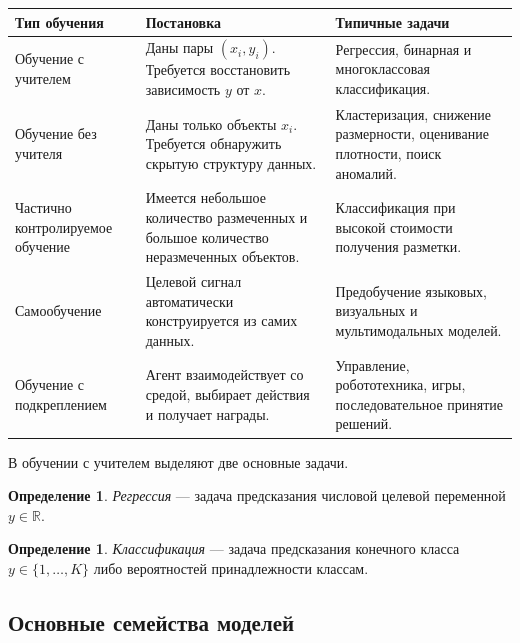 \documentclass[12pt,a4paper]{article}
\theoremstyle{definition}
\newtheorem{definition}[theorem]{Определение}
\theoremstyle{remark}
\newcommand{\R}{\mathbb{R}}
\begin{document}
\begin{table}[ht]
\centering
\begin{tabularx}{\textwidth}{
    >{\raggedright\arraybackslash}p{3.2cm}
    >{\raggedright\arraybackslash}X
    >{\raggedright\arraybackslash}p{4.4cm}}
\toprule
\textbf{Тип обучения} & \textbf{Постановка} & \textbf{Типичные задачи}\\
\midrule
Обучение с учителем &
Даны пары $(x_i,y_i)$. Требуется восстановить зависимость $y$ от $x$. &
Регрессия, бинарная и многоклассовая классификация.\\

Обучение без учителя &
Даны только объекты $x_i$. Требуется обнаружить скрытую структуру данных. &
Кластеризация, снижение размерности, оценивание плотности, поиск аномалий.\\

Частично контролируемое обучение &
Имеется небольшое количество размеченных и большое количество
неразмеченных объектов. &
Классификация при высокой стоимости получения разметки.\\

Самообучение &
Целевой сигнал автоматически конструируется из самих данных. &
Предобучение языковых, визуальных и мультимодальных моделей.\\

Обучение с подкреплением &
Агент взаимодействует со средой, выбирает действия и получает награды. &
Управление, робототехника, игры, последовательное принятие решений.\\
\bottomrule
\end{tabularx}
\end{table}

В обучении с учителем выделяют две основные задачи.

\begin{definition}
\emph{Регрессия} --- задача предсказания числовой целевой переменной
$y\in\R$.
\end{definition}

\begin{definition}
\emph{Классификация} --- задача предсказания конечного класса
$y\in\{1,\ldots,K\}$ либо вероятностей принадлежности классам.
\end{definition}

\subsection{Основные семейства моделей}
\end{document}
